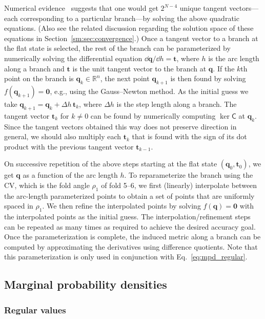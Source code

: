 Numerical evidence~\cite{chen2018} suggests that one would get $2^{N-4}$ unique tangent vectors---each corresponding to a particular branch---by solving the above quadratic equations.
(Also see the related discussion regarding the solution space of these equations in Section~\ref{sm:sec:convergence}.)
Once a tangent vector to a branch at the flat state is selected, the rest of the branch can be parameterized by numerically solving the differential equation $\dd\bm{q}/\dd{h} = \bm{t}$, where $h$ is the arc length along a branch and $\bm{t}$ is the unit tangent vector to the branch at $\bm{q}$.
If the $k$th point on the branch is $\bm{q}_k \in \mathbb{R}^{n}$, the next point $\bm{q}_{k+1}$ is then found by solving $f(\bm{q}_{k+1}) = \bm{0}$, e.g., using the Gauss--Newton method.
As the initial guess we take $\bm{q}_{k+1} = \bm{q}_{k} + \Delta h\,\bm{t}_{k}$, where $\Delta h$ is the step length along a branch.
The tangent vector $\bm{t}_k$ for $k \ne 0$ can be found by numerically computing $\ker\mathsf{C}$ at $\bm{q}_k$.
Since the tangent vectors obtained this way does not preserve direction in general, we should also multiply each $\bm{t}_k$ that is found with the sign of its dot product with the previous tangent vector $\bm{t}_{k-1}$.

On successive repetition of the above steps starting at the flat state $(\bm{q}_0, \bm{t}_0)$, we get $\bm{q}$ as a function of the arc length $h$.
To reparameterize the branch using the CV, which is the fold angle $\rho_{1}$ of fold 5--6, we first (linearly) interpolate between the arc-length parameterized points to obtain a set of points that are uniformly spaced in $\rho_{1}$.
We then refine the interpolated points by solving $f(\bm{q}) = \bm{0}$ with the interpolated points as the initial guess.
The interpolation/refinement steps can be repeated as many times as required to achieve the desired accuracy goal.
Once the parameterization is complete, the induced metric along a branch can be computed by approximating the derivatives using difference quotients.
Note that this parameterization is only used in conjunction with Eq.~\eqref{eq:mpd_regular}.

\subsection{Marginal probability densities}

\subsubsection{Regular values}

